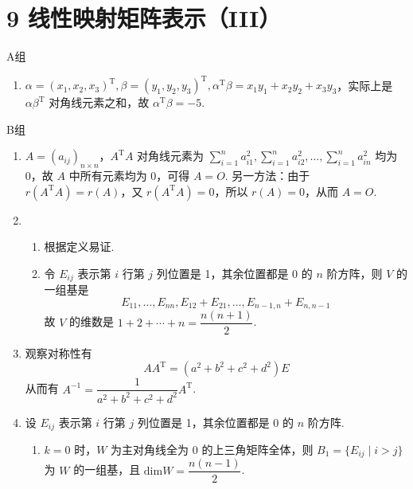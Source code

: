 \section*{9 线性映射矩阵表示（III）}

\vspace{2ex}

\centerline{\heiti A组}
\begin{enumerate}
    \item $\alpha = (x_1,x_2,x_3)^{\mathrm{T}},\beta = (y_1,y_2,y_3)^{\mathrm{T}},\alpha^{\mathrm{T}}\beta=x_1y_1+x_2y_2+x_3y_3$，实际上是 $\alpha\beta^{\mathrm{T}}$ 对角线元素之和，故 $\alpha^{\mathrm{T}}\beta=-5$.
\end{enumerate}

\centerline{\heiti B组}
\begin{enumerate}
    \item $A=(a_{ij})_{n\times n}$，$A^\mathrm{T}A$ 对角线元素为 $\displaystyle\sum_{i=1}^na_{i1}^2,\displaystyle\sum_{i=1}^na_{i2}^2,\ldots,\displaystyle\sum_{i=1}^na_{in}^2$ 均为 0，故 $A$ 中所有元素均为 0，可得 $A=O$. 另一方法：由于 $r(A^\mathrm{T}A) = r(A)$，又 $r(A^\mathrm{T}A)=0$，所以 $r(A)=0$，从而 $A=O$.

    \item \begin{enumerate}
              \item 根据定义易证.

              \item 令 $E_{ij}$ 表示第 $i$ 行第 $j$ 列位置是 1，其余位置都是 0 的 $n$ 阶方阵，则 $V$ 的一组基是
                    \[E_{11},\ldots,E_{nn},E_{12}+E_{21},\ldots,E_{n-1,n}+E_{n,n-1}\]
                    故 $V$ 的维数是 $1+2+\cdots+n=\dfrac{n(n+1)}{2}$.
          \end{enumerate}

    \item 观察对称性有
          \[AA^{\mathrm{T}}=(a^2+b^2+c^2+d^2)E\]
          从而有 $A^{-1}=\dfrac{1}{a^2+b^2+c^2+d^2}A^{\mathrm{T}}$.

    \item 设 $E_{ij}$ 表示第 $i$ 行第 $j$ 列位置是 1，其余位置都是 0 的 $n$ 阶方阵.
          \begin{enumerate}
              \item $k=0$ 时，$W$ 为主对角线全为 0 的上三角矩阵全体，则 $B_1=\{E_{ij} \mid i>j\}$ 为 $W$ 的一组基，且 $\mathrm{dim}W=\dfrac{n(n-1)}{2}$.


\end{enumerate}
\end{enumerate}
